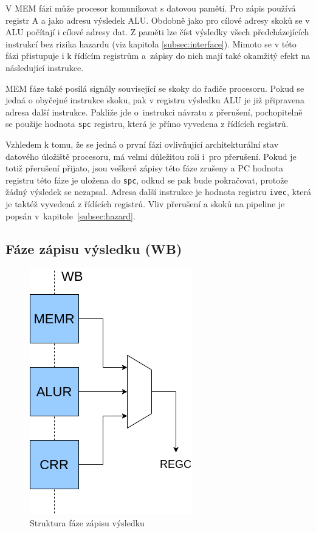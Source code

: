 \documentclass[
  digital, %
  color,   %
  table,   %
  twoside, %
  nolof,   %
  nolot,   %
]{fithesis3}
\begin{document}
V MEM fázi může procesor komunikovat s datovou pamětí. Pro zápis používá registr A a jako adresu výsledek ALU. Obdobně jako pro cílové adresy skoků se v ALU počítají i cílové adresy dat. Z paměti lze číst výsledky všech předcházejících instrukcí bez rizika hazardu (viz kapitola \ref{subsec:interface}). Mimoto se v této fázi přistupuje i k řídícím registrům a~zápisy do nich mají také okamžitý efekt na následující instrukce.

MEM fáze také posílá signály související se skoky do řadiče procesoru. Pokud se jedná o obyčejné instrukce skoku, pak v registru výsledku ALU je již připravena adresa další instrukce. Pakliže jde o~instrukci návratu z přerušení, pochopitelně se použije hodnota \texttt{spc} registru, která je přímo vyvedena z řídících registrů.

Vzhledem k tomu, že se jedná o první fázi ovlivňující architekturální stav datového úložiště procesoru, má velmi důležitou roli i~pro přerušení. Pokud je totiž přerušení přijato, jsou veškeré zápisy této fáze zrušeny a PC hodnota registru této fáze je uložena do \texttt{spc}, odkud se pak bude pokračovat, protože žádný výsledek se nezapsal. Adresa další instrukce je hodnota registru \texttt{ivec}, která je taktéž vyvedená z řídících registrů. Vliv přerušení a skoků na pipeline je popsán v~kapitole~\ref{subsec:hazard}.

\subsection{Fáze zápisu výsledku (WB)}
\begin{figure}[H]
  \begin{center}
    \includegraphics[height=0.3\textheight]{img/risc63-wb}
  \end{center}
  \caption{Struktura fáze zápisu výsledku}
\end{figure}
\end{document}
